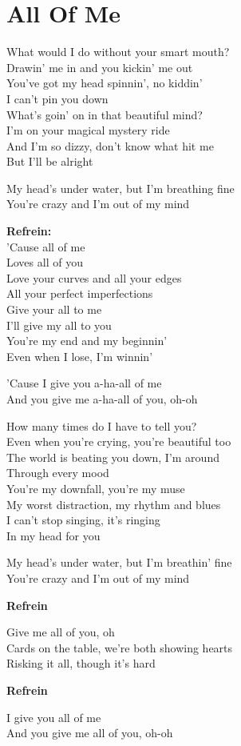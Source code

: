\section{All Of Me}
What would I do without your smart mouth?\\
Drawin' me in and you kickin' me out\\
You've got my head spinnin', no kiddin'\\
I can't pin you down\\
What's goin' on in that beautiful mind?\\
I'm on your magical mystery ride\\
And I'm so dizzy, don't know what hit me\\
But I'll be alright

My head's under water, but I'm breathing fine\\
You're crazy and I'm out of my mind

\textbf{Refrein:}\\
'Cause all of me\\
Loves all of you\\
Love your curves and all your edges\\
All your perfect imperfections\\
Give your all to me\\
I'll give my all to you\\
You're my end and my beginnin'\\
Even when I lose, I'm winnin'

'Cause I give you a-ha-all of me\\
And you give me a-ha-all of you, oh-oh

How many times do I have to tell you?\\
Even when you're crying, you're beautiful too\\
The world is beating you down, I'm around\\
Through every mood\\
You're my downfall, you're my muse\\
My worst distraction, my rhythm and blues\\
I can't stop singing, it's ringing\\
In my head for you

My head's under water, but I'm breathin' fine\\
You're crazy and I'm out of my mind

\textbf{Refrein}

Give me all of you, oh\\
Cards on the table, we're both showing hearts\\
Risking it all, though it's hard

\textbf{Refrein}

I give you all of me\\
And you give me all of you, oh-oh